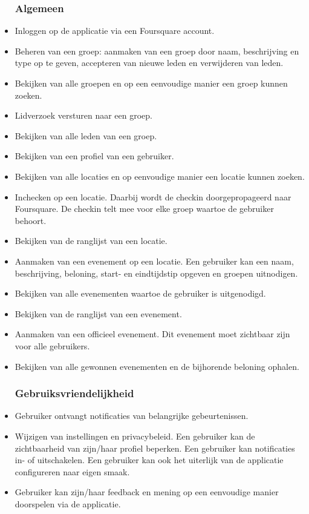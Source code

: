 \begin{itemize}
	
\subsubsection{Algemeen}
\item Inloggen op de applicatie via een Foursquare account.
\item Beheren van een groep: aanmaken van een groep door naam, beschrijving en type op te geven, accepteren van nieuwe leden en verwijderen van leden.   
\item Bekijken van alle groepen en op een eenvoudige manier een groep kunnen zoeken.
\item Lidverzoek versturen naar een groep.
\item Bekijken van alle leden van een groep.
\item Bekijken van een profiel van een gebruiker.
\item Bekijken van alle locaties en op eenvoudige manier een locatie kunnen zoeken.
\item Inchecken op een locatie. Daarbij wordt de checkin doorgepropageerd naar Foursquare. De checkin telt mee voor elke groep waartoe de gebruiker behoort. 
\item Bekijken van de ranglijst van een locatie.
\item Aanmaken van een evenement op een locatie. Een gebruiker kan een naam, beschrijving, beloning, start- en eindtijdstip opgeven en groepen uitnodigen.
\item Bekijken van alle evenementen waartoe de gebruiker is uitgenodigd.
\item Bekijken van de ranglijst van een evenement.
\item Aanmaken van een officieel evenement. Dit evenement moet zichtbaar zijn voor alle gebruikers.
\item Bekijken van alle gewonnen evenementen en de bijhorende beloning ophalen.

\subsubsection{Gebruiksvriendelijkheid}

\item Gebruiker ontvangt notificaties van belangrijke gebeurtenissen.
\item Wijzigen van instellingen en privacybeleid. Een gebruiker kan de zichtbaarheid van zijn/haar profiel beperken. Een gebruiker kan notificaties in- of uitschakelen. Een gebruiker kan ook het uiterlijk van de applicatie configureren naar eigen smaak.
\item Gebruiker kan zijn/haar feedback en mening op een eenvoudige manier doorspelen via de applicatie.

\end{itemize}

